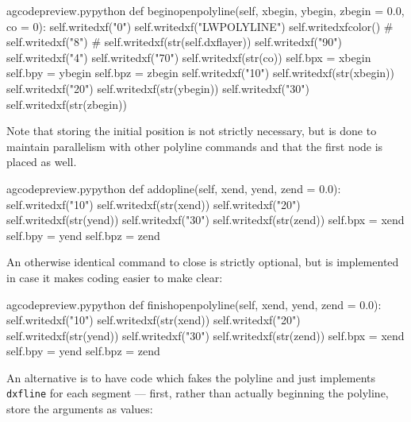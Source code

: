 \documentclass{ltxdoc}
\begin{document}
\lstset{firstnumber=\thegcpy}
\begin{writecode}{a}{gcodepreview.py}{python}
    def beginopenpolyline(self, xbegin, ybegin, zbegin = 0.0, co = 0):
        self.writedxf("0")
        self.writedxf("LWPOLYLINE")
        self.writedxfcolor()
#        self.writedxf("8")
#        self.writedxf(str(self.dxflayer))
        self.writedxf("90")
        self.writedxf("4")
        self.writedxf("70")
        self.writedxf(str(co))
        self.bpx = xbegin
        self.bpy = ybegin
        self.bpz = zbegin
        self.writedxf("10")
        self.writedxf(str(xbegin))
        self.writedxf("20")
        self.writedxf(str(ybegin))
        self.writedxf("30")
        self.writedxf(str(zbegin))

\end{writecode}
\addtocounter{gcpy}{20}

\noindent Note that storing the initial position is not strictly necessary, but is done to maintain parallelism with other polyline commands and that the first node is placed as well.

\begin{writecode}{a}{gcodepreview.py}{python}
    def addopline(self, xend, yend, zend = 0.0):
        self.writedxf("10")
        self.writedxf(str(xend))
        self.writedxf("20")
        self.writedxf(str(yend))
        self.writedxf("30")
        self.writedxf(str(zend))
        self.bpx = xend
        self.bpy = yend
        self.bpz = zend

\end{writecode}
\addtocounter{gcpy}{11}

An otherwise identical command to close is strictly optional, but is implemented in case it makes coding easier to make clear:

\begin{writecode}{a}{gcodepreview.py}{python}
    def finishopenpolyline(self, xend, yend, zend = 0.0):
        self.writedxf("10")
        self.writedxf(str(xend))
        self.writedxf("20")
        self.writedxf(str(yend))
        self.writedxf("30")
        self.writedxf(str(zend))
        self.bpx = xend
        self.bpy = yend
        self.bpz = zend

\end{writecode}
\addtocounter{gcpy}{11}

An alternative is to have code which fakes the polyline and just implements \verb|dxfline| for each segment --- first, rather than actually beginning the polyline, store the arguments as values:
\end{document}
